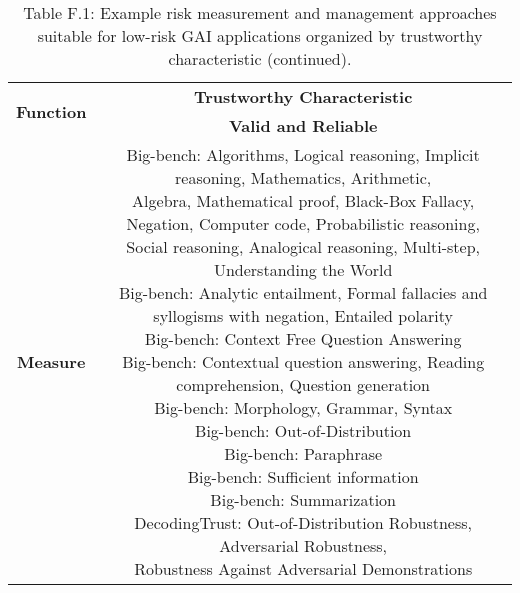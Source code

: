 \documentclass[fleqn]{article}
\begin{document}
\begin{table}[H]
	\caption*{Table F.1: Example risk measurement and management approaches suitable for low-risk GAI applications organized by trustworthy characteristic (continued).}
	\footnotesize
	\begin{tabular}{|c|c|}
		\hline
		\multirow{2}{*}{\textbf{Function}} & \multicolumn{1}{|c|}{\textbf{Trustworthy Characteristic}}   \\
		\cline{2-2}
		& \textbf{Valid and Reliable} \\
		\hline
		\textbf{Measure} 
		& 
		\makecell[l]{ 
			\textbullet\hspace{3pt} Big-bench: Algorithms, Logical reasoning, Implicit reasoning, Mathematics, Arithmetic, \\\hspace{10pt}Algebra, Mathematical proof, Black-Box Fallacy, Negation, Computer code, Probabilistic reasoning, \\\hspace{10pt}Social reasoning, Analogical reasoning, Multi-step, Understanding the World \\ 
			\textbullet\hspace{3pt} Big-bench: Analytic entailment, Formal fallacies and syllogisms with negation, Entailed polarity \\ 
			\textbullet\hspace{3pt} Big-bench: Context Free Question Answering \\ 
			\textbullet\hspace{3pt} Big-bench: Contextual question answering, Reading comprehension, Question generation \\ 
			\textbullet\hspace{3pt} Big-bench: Morphology, Grammar, Syntax \\ 
			\textbullet\hspace{3pt} Big-bench: Out-of-Distribution \\ 
			\textbullet\hspace{3pt} Big-bench: Paraphrase \\ 
			\textbullet\hspace{3pt} Big-bench: Sufficient information \\ 
			\textbullet\hspace{3pt} Big-bench: Summarization \\ 
			\textbullet\hspace{3pt} DecodingTrust: Out-of-Distribution Robustness, Adversarial Robustness,\\\hspace{10pt}Robustness Against Adversarial Demonstrations \\ 
}
\end{tabular}
\end{table}
\end{document}
